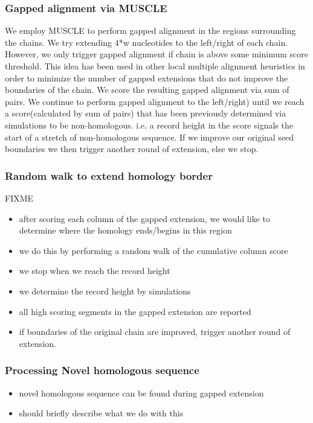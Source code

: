 \documentclass{llncs}
\begin{document}
\subsubsection{Gapped alignment via MUSCLE}
We employ MUSCLE to perform gapped alignment in the regions surrounding the chains. We try extending 4*w nucleotides to the left/right of each chain. However, we only trigger gapped alignment if chain is above some minimum score threshold. This idea has been used in other local multiple alignment heuristics in order to minimize the number of gapped extensions that do not improve the boundaries of the chain. We score the resulting gapped alignment via sum of pairs. We continue to perform gapped alignment to the left/right) until we reach a score(calculated by sum of pairs) that has been previously determined via simulations to be non-homologous. i.e. a record height in the score signals the start of a stretch of non-homologous sequence.  If we improve our original seed boundaries we then trigger another round of extension, else we stop.


\subsubsection{Random walk to extend homology border}
FIXME
\begin{itemize}
\item after scoring each column of the gapped extension, we would like
to determine where the homology ends/begins in this region
\item we do this by performing a random walk of the cumulative column score
\item we stop when we reach the record height
\item we determine the record height by simulations
\item all high scoring segments in the gapped extension are reported
\item if boundaries of the original chain are improved, trigger another round of extension.
\end{itemize}

\subsubsection{Processing Novel homologous sequence}
\begin{itemize}
\item novel homologous sequence can be found during gapped extension
\item should briefly describe what we do with this
\end{itemize}
\end{document}
